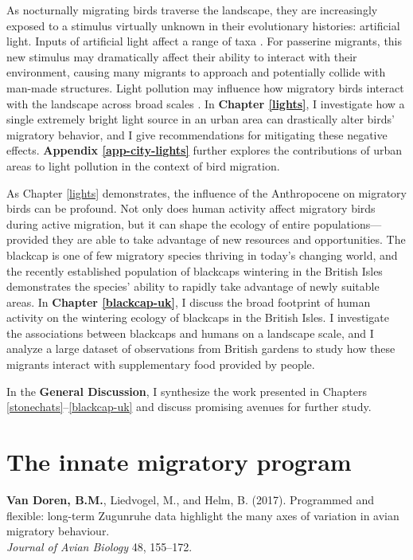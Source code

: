 \documentclass[a4paper, nobind]{templates/ociamthesis}
\begin{document}
As nocturnally migrating birds traverse the landscape, they are increasingly exposed to a stimulus virtually unknown in their evolutionary histories: artificial light. Inputs of artificial light affect a range of taxa \autocite{gastonEcologicalImpactsNighttime2013}. For passerine migrants, this new stimulus may dramatically affect their ability to interact with their environment, causing many migrants to approach and potentially collide with man-made structures. Light pollution may influence how migratory birds interact with the landscape across broad scales \autocite{mclarenArtificialLightNight2018}. In \textbf{Chapter \ref{lights}}, I investigate how a single extremely bright light source in an urban area can drastically alter birds' migratory behavior, and I give recommendations for mitigating these negative effects. \textbf{Appendix \ref{app-city-lights}} further explores the contributions of urban areas to light pollution in the context of bird migration.

As Chapter \ref{lights} demonstrates, the influence of the Anthropocene on migratory birds can be profound. Not only does human activity affect migratory birds during active migration, but it can shape the ecology of entire populations---provided they are able to take advantage of new resources and opportunities. The blackcap is one of few migratory species thriving in today's changing world, and the recently established population of blackcaps wintering in the British Isles demonstrates the species' ability to rapidly take advantage of newly suitable areas. In \textbf{Chapter \ref{blackcap-uk}}, I discuss the broad footprint of human activity on the wintering ecology of blackcaps in the British Isles. I investigate the associations between blackcaps and humans on a landscape scale, and I analyze a large dataset of observations from British gardens to study how these migrants interact with supplementary food provided by people.

In the \textbf{General Discussion}, I synthesize the work presented in Chapters \ref{stonechats}--\ref{blackcap-uk} and discuss promising avenues for further study.

\printbibliography[segment=\therefsection,heading=subbibliography]

\part{The innate migratory program}

\begin{savequote}
\textbf{Van Doren, B.M.}, Liedvogel, M., and Helm, B. (2017). Programmed
and flexible: long-term Zugunruhe data highlight the many axes of
variation in avian migratory behaviour.\\
\emph{Journal of Avian Biology} 48, 155--172.
\end{savequote}
\end{document}
